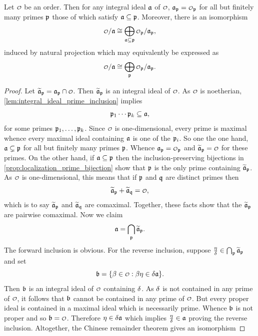    \begin{proposition}\label{prop:localized_Chinese_remainder_theorem}
      Let \(\smc{O}\) be an order. Then for any integral ideal \(\mathfrak{a}\) of \(\smc{O}\), \(\mf{a}_{\mf{p}} = \smc{O}_{\mf{p}}\) for all but finitely many primes \(\mathfrak{p}\) those of which satisfy \(\mathfrak{a} \subseteq \mathfrak{p}\). Moreover, there is an isomorphism
      \[
        \smc{O}/\mf{a} \cong \bigop_{\mf{a} \subseteq \mf{p}}\smc{O}_{\mf{p}}/\mf{a}_{\mf{p}},
      \]
      induced by natural projection which may equivalently be expressed as
      \[
        \smc{O}/\mf{a} \cong \bigop_{\mf{p}}\smc{O}_{\mf{p}}/\mf{a}_{\mf{p}}.
      \]
    \end{proposition}
    \begin{proof}
      Let \(\wtilde{\mf{a}}_{\mf{p}} = \mf{a}_{\mf{p}} \cap \smc{O}\). Then \(\widetilde{\mathfrak{a}}_{\mathfrak{p}}\) is an integral ideal of \(\smc{O}\). As \(\smc{O}\) is noetherian, \cref{lem:integral_ideal_prime_inclusion} implies
      \[
        \mathfrak{p}_{1} \cdots \mathfrak{p}_{k} \subseteq \mathfrak{a},
      \]
      for some primes \(\mathfrak{p}_{1},\ldots,\mathfrak{p}_{k}\). Since \(\smc{O}\) is one-dimensional, every prime is maximal whence every maximal ideal containing \(\mathfrak{a}\) is one of the \(\mathfrak{p}_{i}\). So one the one hand, \(\mathfrak{a} \subsetneq \mathfrak{p}\) for all but finitely many primes \(\mathfrak{p}\). Whence \(\mf{a}_{\mf{p}} = \smc{O}_{\mf{p}}\) and \(\wtilde{\mf{a}}_{\mf{p}} = \smc{O}\) for these primes. On the other hand, if \(\mathfrak{a} \subseteq \mathfrak{p}\) then the inclusion-preserving bijections in \cref{prop:localization_prime_bijection} show that \(\mathfrak{p}\) is the only prime containing \(\widetilde{\mathfrak{a}}_{\mathfrak{p}}\). As \(\smc{O}\) is one-dimensional, this means that if \(\mathfrak{p}\) and \(\mathfrak{q}\) are distinct primes then
      \[
        \wtilde{\mf{a}}_{\mf{p}}+\wtilde{\mf{a}}_{\mf{q}} = \smc{O},
      \]
      which is to say \(\widetilde{\mathfrak{a}}_{\mathfrak{p}}\) and \(\widetilde{\mathfrak{a}}_{\mathfrak{q}}\) are comaximal. Together, these facts show that the \(\widetilde{\mathfrak{a}}_{\mathfrak{p}}\) are pairwise comaximal. Now we claim
      \[
        \mathfrak{a} = \bigcap_{\mathfrak{p}}\widetilde{\mathfrak{a}}_{\mathfrak{p}}.
      \]
      The forward inclusion is obvious. For the reverse inclusion, suppose \(\frac{\eta}{\delta} \in \bigcap_{\mathfrak{p}}\widetilde{\mathfrak{a}}_{\mathfrak{p}}\) and set
      \[
        \mf{b} = \{\b \in \smc{O}:\b\eta \in \d\mf{a}\}.
      \]
      Then \(\mathfrak{b}\) is an integral ideal of \(\smc{O}\) containing \(\delta\). As \(\delta\) is not contained in any prime of \(\smc{O}\), it follows that \(\mathfrak{b}\) cannot be contained in any prime of \(\smc{O}\). But every proper ideal is contained in a maximal ideal which is necessarily prime. Whence \(\mathfrak{b}\) is not proper and so \(\mf{b} = \smc{O}\). Therefore \(\eta \in \delta\mathfrak{a}\) which implies \(\frac{\eta}{\delta} \in \mathfrak{a}\) proving the reverse inclusion. Altogether, the Chinese remainder theorem gives an isomorphism

\end{proof}
